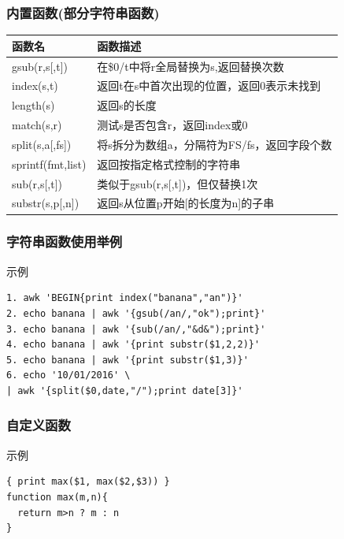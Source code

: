 \documentclass[xcolor=svgnames,presentation]{beamer}
\begin{document}
\begin{frame}
\frametitle{内置函数(部分字符串函数)}
\label{sec-2-2-15}


\begin{center}
\begin{tabular}{ll}
 函数名             &  函数描述                                     \\
\hline
 gsub(r,s[,t])      &  在\$0/t中将r全局替换为s,返回替换次数         \\
 index(s,t)         &  返回t在s中首次出现的位置，返回0表示未找到    \\
 length(s)          &  返回s的长度                                  \\
 match(s,r)         &  测试s是否包含r，返回index或0                 \\
 split(s,a[,fs])    &  将s拆分为数组a，分隔符为FS/fs，返回字段个数  \\
 sprintf(fmt,list)  &  返回按指定格式控制的字符串                   \\
 sub(r,s[,t])       &  类似于gsub(r,s[,t])，但仅替换1次             \\
 substr(s,p[,n])    &  返回s从位置p开始[的长度为n]的子串            \\
\end{tabular}
\end{center}
\end{frame}
\begin{frame}[fragile]
\frametitle{字符串函数使用举例}
\label{sec-2-2-16}
\begin{exampleblock}{示例}
\label{sec-2-2-16-1}


\begin{verbatim}
1. awk 'BEGIN{print index("banana","an")}'
2. echo banana | awk '{gsub(/an/,"ok");print}'
3. echo banana | awk '{sub(/an/,"&d&");print}'
4. echo banana | awk '{print substr($1,2,2)}'
5. echo banana | awk '{print substr($1,3)}'
6. echo '10/01/2016' \
| awk '{split($0,date,"/");print date[3]}'
\end{verbatim}
\end{exampleblock}
\end{frame}
\begin{frame}[fragile]
\frametitle{自定义函数}
\label{sec-2-2-17}
\begin{exampleblock}{示例}
\label{sec-2-2-17-1}


\begin{verbatim}
{ print max($1, max($2,$3)) }
function max(m,n){
  return m>n ? m : n
}
\end{verbatim}
\end{exampleblock}
\end{frame}
\end{document}
